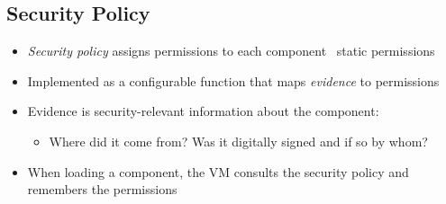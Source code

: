 \documentclass[12pt,titlepage,a4paper]{report}
\begin{document}
			\subsection{Security Policy}
			\begin{itemize}
				\item \textit{Security policy} assigns permissions to each component \textrightarrow \, static permissions
				\item Implemented as a configurable function that maps \textit{evidence} to permissions
				\item Evidence is security-relevant information about the component:
				\begin{itemize}
					\item Where did it come from? Was it digitally signed and if so by whom?
				\end{itemize}
				\item When loading a component, the VM consults the security policy and remembers the permissions
			\end{itemize}
\end{document}
